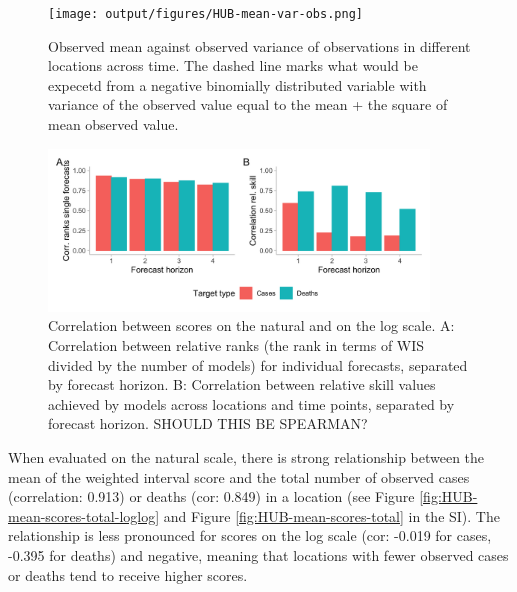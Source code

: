 \documentclass{article}
\begin{document}
\begin{figure}[h!]
    \centering
    \texttt{[image: output/figures/HUB-mean-var-obs.png]}
    \caption{Observed mean against observed variance of observations in different locations across time. The dashed line marks what would be expecetd from a negative binomially distributed variable with variance of the observed value equal to the mean + the square of mean observed value. }
    \label{fig:HUB-variance-mean}
\end{figure}

\begin{figure}[h!]
    \centering
    \includegraphics[width=0.9\textwidth]{output/figures/HUB-cors.png}
    \caption{Correlation between scores on the natural and on the log scale. A: Correlation between relative ranks (the rank in terms of WIS divided by the number of models) for individual forecasts, separated by forecast horizon. B: Correlation between relative skill values achieved by models across locations and time points, separated by forecast horizon. SHOULD THIS BE SPEARMAN?}
    \label{fig:HUB-cors}
\end{figure}

When evaluated on the natural scale, there is  strong relationship between the mean of the weighted interval score and the total number of observed cases (correlation: 0.913) or deaths (cor: 0.849) in a location (see Figure \ref{fig:HUB-mean-scores-total-loglog} and Figure \ref{fig:HUB-mean-scores-total} in the SI). The relationship is less pronounced for scores on the log scale (cor: -0.019 for cases, -0.395 for deaths) and negative, meaning that locations with fewer observed cases or deaths tend to receive higher scores. 
\end{document}
